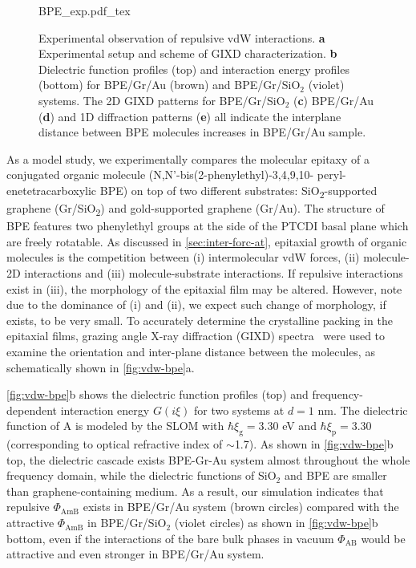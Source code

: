\begin{figure}[!htbp]
  \centering{}
  {BPE_exp.pdf_tex}
  \caption{\label{fig:vdw-bpe}%
    Experimental observation of repulsive vdW interactions. \textbf{a}
    Experimental setup and scheme of GIXD characterization. \textbf{b}
    Dielectric function profiles (top) and interaction energy profiles
    (bottom) for BPE/Gr/Au (brown) and BPE/Gr/SiO$_{2}$ (violet)
    systems. The 2D GIXD patterns for BPE/Gr/SiO$_{2}$ (\textbf{c})
    BPE/Gr/Au (\textbf{d}) and 1D diffraction patterns (\textbf{e})
    all indicate the inter\-plane distance between BPE molecules
    increases in BPE/Gr/Au sample. }
\end{figure}

%

As a model study, we experimentally compares the molecular
epitaxy of a conjugated organic molecule (N,N’-bis(2-phenyl\-ethyl)-3,4,9,10- peryl-ene\-tetra\-carboxylic BPE) on top of two different
substrates: SiO\textsubscript{2}-supported graphene
(Gr/SiO\textsubscript{2}) and gold-supported graphene (Gr/Au).
The structure of BPE features two phenyl\-ethyl groups at the side of
the PTCDI basal plane which are freely rotatable. 
%
As discussed in \autoref{sec:inter-forc-at}, epitaxial growth of
organic molecules is the competition between (i) intermolecular vdW
forces, (ii) molecule-2D interactions and (iii) molecule-substrate
interactions.
%
If repulsive interactions exist in (iii), the morphology of the
epitaxial film may be altered.  However, note due to the dominance of (i) and
(ii), we expect such change of morphology, if exists, to be very
small.
%
To accurately determine the crystalline packing in the epitaxial
films, grazing angle X-ray diffraction (GIXD)
spectra~\cite{Shih_2015_PartiallyScreened} were used to examine the
orientation and inter-plane distance between the molecules, as
schematically shown in \autoref{fig:vdw-bpe}a.
%

\autoref{fig:vdw-bpe}b shows the dielectric function profiles (top)
and frequency-dependent interaction energy $G(i \xi)$ for two systems
at $d=1$ nm.
%
The dielectric function of A is modeled by the SLOM with
$\hbar \xi_{\mathrm{g}}=3.30$ eV and $\hbar \xi_{\mathrm{p}}=3.30$
(corresponding to optical refractive index of $\sim{}$1.7).
%
As shown in \autoref{fig:vdw-bpe}b top, the dielectric cascade exists
BPE-Gr-Au system almost throughout the whole frequency domain, while
the dielectric functions of SiO$_{2}$ and BPE are smaller than graphene-containing medium.
%
As a result, our simulation indicates that repulsive
$\Phi_{\mathrm{AmB}}$ exists in BPE/Gr/Au system (brown circles)
compared with the attractive $\Phi_{\mathrm{AmB}}$ in BPE/Gr/SiO$_{2}$
(violet circles) as shown in \autoref{fig:vdw-bpe}b bottom, even if
the interactions of the bare bulk phases in vacuum
$\Phi_{\mathrm{AB}}$ would be attractive and even stronger in
BPE/Gr/Au system.
%
%

